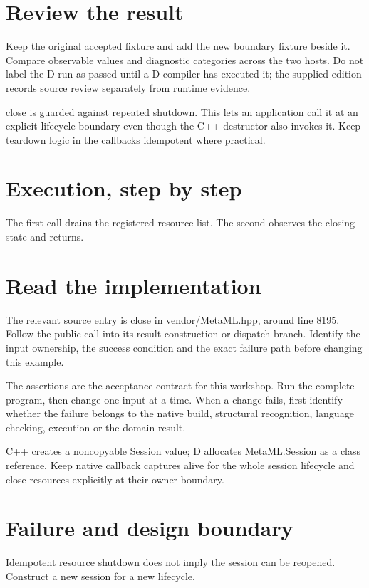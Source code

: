 \section*{Review the result}
Keep the original accepted fixture and add the new boundary fixture beside it. Compare observable values and diagnostic categories across the two hosts. Do not label the D run as passed until a D compiler has executed it; the supplied edition records source review separately from runtime evidence.

\clearpage
{}
close is guarded against repeated shutdown. This lets an application call it at an explicit lifecycle boundary even though the C++ destructor also invokes it. Keep teardown logic in the callbacks idempotent where practical.


\section*{Execution, step by step}
The first call drains the registered resource list. The second observes the closing state and returns.

\section*{Read the implementation}
The relevant source entry is close in vendor/MetaML.hpp, around line 8195. Follow the public call into its result construction or dispatch branch. Identify the input ownership, the success condition and the exact failure path before changing this example.

The assertions are the acceptance contract for this workshop. Run the complete program, then change one input at a time. When a change fails, first identify whether the failure belongs to the native build, structural recognition, language checking, execution or the domain result.

\clearpage
{}
C++ creates a noncopyable Session value; D allocates MetaML.Session as a class reference. Keep native callback captures alive for the whole session lifecycle and close resources explicitly at their owner boundary.


\section*{Failure and design boundary}
Idempotent resource shutdown does not imply the session can be reopened. Construct a new session for a new lifecycle.

